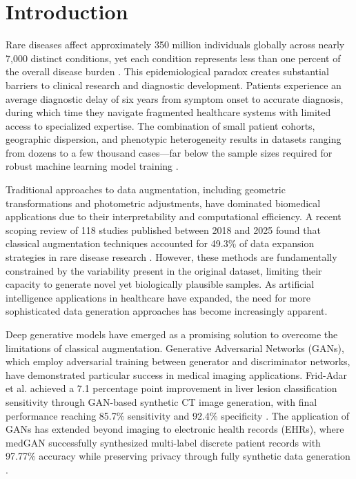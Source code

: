 \section{Introduction}

Rare diseases affect approximately 350 million individuals globally across nearly 7,000 distinct conditions, yet each condition represents less than one percent of the overall disease burden \cite{finetti2025data}. This epidemiological paradox creates substantial barriers to clinical research and diagnostic development. Patients experience an average diagnostic delay of six years from symptom onset to accurate diagnosis, during which time they navigate fragmented healthcare systems with limited access to specialized expertise. The combination of small patient cohorts, geographic dispersion, and phenotypic heterogeneity results in datasets ranging from dozens to a few thousand cases---far below the sample sizes required for robust machine learning model training \cite{finetti2025data,mendes2025synthetic}.

Traditional approaches to data augmentation, including geometric transformations and photometric adjustments, have dominated biomedical applications due to their interpretability and computational efficiency. A recent scoping review of 118 studies published between 2018 and 2025 found that classical augmentation techniques accounted for 49.3\% of data expansion strategies in rare disease research \cite{finetti2025data}. However, these methods are fundamentally constrained by the variability present in the original dataset, limiting their capacity to generate novel yet biologically plausible samples. As artificial intelligence applications in healthcare have expanded, the need for more sophisticated data generation approaches has become increasingly apparent.

Deep generative models have emerged as a promising solution to overcome the limitations of classical augmentation. Generative Adversarial Networks (GANs), which employ adversarial training between generator and discriminator networks, have demonstrated particular success in medical imaging applications. Frid-Adar et al. achieved a 7.1 percentage point improvement in liver lesion classification sensitivity through GAN-based synthetic CT image generation, with final performance reaching 85.7\% sensitivity and 92.4\% specificity \cite{fridadar2018gan}. The application of GANs has extended beyond imaging to electronic health records (EHRs), where medGAN successfully synthesized multi-label discrete patient records with 97.77\% accuracy while preserving privacy through fully synthetic data generation \cite{choi2017generating}.

